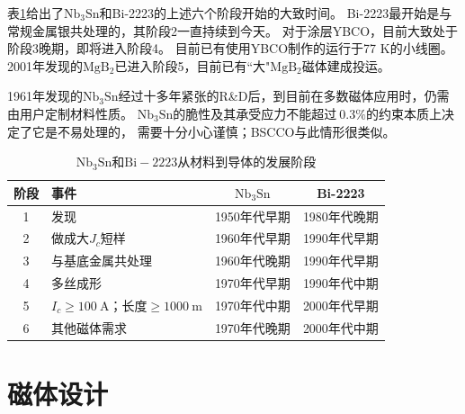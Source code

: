 表\ref{scstage}给出了$\mathrm{Nb_3Sn}$和Bi-2223的上述六个阶段开始的大致时间。
Bi-2223最开始是与常规金属银共处理的，其阶段2一直持续到今天。
对于涂层YBCO，目前大致处于阶段3晚期，即将进入阶段4。
目前已有使用YBCO制作的运行于77 K的小线圈。
2001年发现的$\mathrm{MgB_2}$已进入阶段5，目前已有``大"$\mathrm{MgB_2}$磁体建成投运。

1961年发现的$\mathrm{Nb_3Sn}$经过十多年紧张的R\&D后，到目前在多数磁体应用时，仍需由用户定制材料性质。
$\mathrm{Nb_3Sn}$的脆性及其承受应力不能超过$~0.3\%$的约束本质上决定了它是不易处理的，
需要十分小心谨慎；BSCCO与此情形很类似。

\begin{table}[htbp]\small
  \centering
  \caption{$\mathrm{Nb_3Sn}$和$\mathrm{Bi-2223}$从材料到导体的发展阶段} \label{scstage}
\begin{tabular}{|c|l|c|c|}
  \hline
  阶段&事件& $\mathrm{Nb_3Sn}$ &Bi-2223 \\ \hline
1 & 发现 & 1950年代早期& 1980年代晚期 \\ \hline
2 & 做成大$J_c$短样 & 1960年代早期 & 1990年代早期\\ \hline
3 &与基底金属共处理&1960年代晚期&1990年代早期\\ \hline
4 &多丝成形&1970年代早期&1990年代中期\\ \hline
5 &$I_c\ge 100\ \mathrm{A}$；长度$\ge 1000\ \mathrm{m}$ &1970年代中期&2000年代早期\\ \hline
6 &其他磁体需求&1970年代晚期&2000年代中期\\
  \hline
\end{tabular}
\end{table}


\section{磁体设计}
